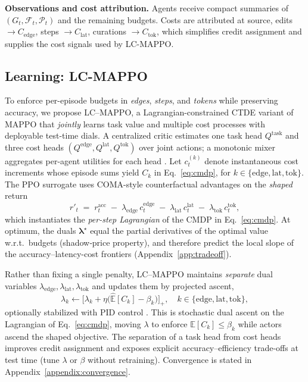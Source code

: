 \documentclass{article} %
\newcommand{\lagvec}{\boldsymbol{\lambda}}       %
\begin{document}
\textbf{Observations and cost attribution.}
Agents receive compact summaries of $(G_t,\mathcal{F}_t,\mathcal{P}_t)$ and the remaining budgets. Costs are attributed at source, edits $\!\rightarrow\! C_{\mathrm{edge}}$, steps $\!\rightarrow\! C_{\mathrm{lat}}$, curations $\!\rightarrow\! C_{\mathrm{tok}}$, which simplifies credit assignment and supplies the cost signals used by LC-MAPPO.


\subsection{Learning: LC-MAPPO}
\label{sec:training}

To enforce per-episode budgets in \emph{edges}, \emph{steps}, and \emph{tokens} while preserving accuracy, we propose LC–MAPPO, a Lagrangian-constrained CTDE variant of MAPPO that \emph{jointly} learns task value and multiple cost processes with deployable test-time dials. A centralized critic estimates one task head $Q^{\mathrm{task}}$ and three cost heads $(Q^{\mathrm{edge}},Q^{\mathrm{lat}},Q^{\mathrm{tok}})$ over joint actions; a monotonic mixer aggregates per-agent utilities for each head \citep{rashid2018qmix}. Let $c_t^{(k)}$ denote instantaneous cost increments whose episode sums yield $C_k$ in Eq.~\ref{eq:cmdp}, for $k\!\in\!\{\text{edge},\text{lat},\text{tok}\}$. The PPO surrogate uses COMA-style counterfactual advantages \citep{foerster2018coma,schulman2017ppo,yu2022surprising} on the \emph{shaped} return
\begin{equation}
\label{eq:shaped}
r'_t \;=\; r^{\mathrm{acc}}_t \;-\; \lambda_{\mathrm{edge}}\,c^{\mathrm{edge}}_t \;-\; \lambda_{\mathrm{lat}}\,c^{\mathrm{lat}}_t \;-\; \lambda_{\mathrm{tok}}\,c^{\mathrm{tok}}_t,
\end{equation}
which instantiates the \emph{per-step Lagrangian} of the CMDP in Eq.~\ref{eq:cmdp}. At optimum, the duals $\lagvec^\star$ equal the partial derivatives of the optimal value w.r.t.\ budgets (shadow‑price property), and therefore predict the local slope of the accuracy–latency-cost frontiers (Appendix~\ref{app:tradeoff}).

Rather than fixing a single penalty, LC–MAPPO maintains \emph{separate} dual variables $\lambda_{\mathrm{edge}},\lambda_{\mathrm{lat}},\lambda_{\mathrm{tok}}$ and updates them by projected ascent,
\[
\lambda_k \leftarrow \bigl[\lambda_k + \eta\bigl(\widehat{\mathbb{E}}[C_k]-\beta_k\bigr)\bigr]_+,
\quad k\in\{\text{edge},\text{lat},\text{tok}\},
\]
optionally stabilized with PID control \citep{achiam2017constrained,stooke2020pidlagrangian}. This is stochastic dual ascent on the Lagrangian of Eq.~\ref{eq:cmdp}, moving $\lambda$ to enforce $\mathbb{E}[C_k]\!\le\!\beta_k$ while actors ascend the shaped objective. The separation of a task head from cost heads improves credit assignment and exposes explicit accuracy–efficiency trade-offs at test time (tune $\lambda$ or $\beta$ without retraining). Convergence is stated in Appendix~\ref{appendix:convergence}.
\end{document}
